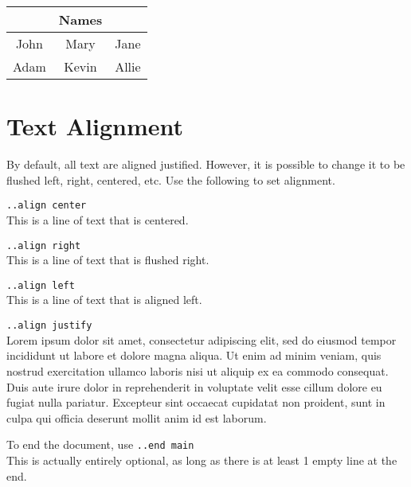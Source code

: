 \documentclass[12pt]{article}
\newcommand{\nl}{\\}
\numberwithin{equation}{section}
\begin{document}
\bigskip

\begin{tabular}{c|c|c}
& Names & \\
\hline
John & Mary & Jane \\
Adam & Kevin & Allie 
\end{tabular}

\newpage

\section{Text Alignment}

By default, all text are aligned justified. However, it is possible to change it to be flushed left, right, centered, etc. Use the following to set alignment.


\begin{center}
\verb|..align center|\nl
This is a line of text that is centered.

\end{center}

\begin{flushright}
\verb|..align right|\nl
This is a line of text that is flushed right.

\end{flushright}

\begin{flushleft}
\verb|..align left|\nl
This is a line of text that is aligned left.

\end{flushleft}
\verb|..align justify|\nl
Lorem ipsum dolor sit amet, consectetur adipiscing elit, sed do eiusmod tempor incididunt ut labore et dolore magna aliqua. Ut enim ad minim veniam, quis nostrud exercitation ullamco laboris nisi ut aliquip ex ea commodo consequat. Duis aute irure dolor in reprehenderit in voluptate velit esse cillum dolore eu fugiat nulla pariatur. Excepteur sint occaecat cupidatat non proident, sunt in culpa qui officia deserunt mollit anim id est laborum.

\bigskip
\bigskip
\bigskip

To end the document, use \verb|..end main|\nl
This is actually entirely optional, as long as there is at least 1 empty line at the end.
\end{document}
